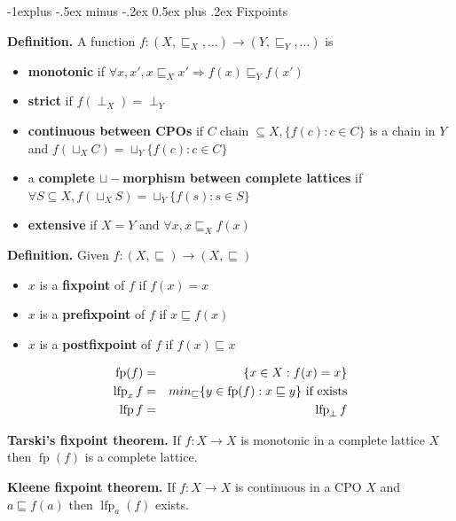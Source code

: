 \documentclass[10pt,landscape]{article}
\makeatletter
\renewcommand{\subsection}{\@startsection{subsection}{2}{0mm}%
                                {-1explus -.5ex minus -.2ex}%
                                {0.5ex plus .2ex}%
                                {\normalfont\normalsize\bfseries}}
\makeatother
\begin{document}
\begin{multicols}{3}
\subsection{Fixpoints}

\textbf{Definition.} A function $f : (X, \sqsubseteq_X, \dots) \rightarrow (Y, \sqsubseteq_Y, \dots)$ is
\begin{itemize}\setlength{\itemsep}{-0.7mm}
\item \textbf{monotonic} if $\forall x, x', x \sqsubseteq_X x' \Rightarrow f(x) \sqsubseteq_Y f(x')$
\item \textbf{strict} if $f (\perp_X) = \perp_Y$
\item \textbf{continuous between CPOs} if $C \operatorname{chain} \subseteq X, \{ f(c) : c \in C \}$ is a chain in $Y$ and $f (\sqcup_X C) = \sqcup_Y \{ f(c) : c \in C\}$
\item a \textbf{complete $\sqcup -$morphism between complete lattices} if $\forall S \subseteq X, f (\sqcup_X S) = \sqcup_Y \{ f(s) : s \in S \}$
\item \textbf{extensive} if $X = Y$ and $\forall x, x \sqsubseteq_X f(x)$
\end{itemize}

\textbf{Definition.} Given $f : (X, \sqsubseteq) \rightarrow (X, \sqsubseteq)$
\begin{itemize}\setlength{\itemsep}{-0.7mm}
\item $x$ is a \textbf{fixpoint} of $f$ if $f(x) = x$
\item $x$ is a \textbf{prefixpoint} of $f$ if $x \sqsubseteq f(x)$
\item $x$ is a \textbf{postfixpoint} of $f$ if $f(x) \sqsubseteq x$
\end{itemize}

\begin{eqnarray*}
  \operatorname{fp} (f) &=& \{ x \in X : f(x) = x\}\\
  \operatorname{lfp}_x f &=& min_{\sqsubseteq}\{ y \in \operatorname{fp}(f) : x \sqsubseteq y \} \textup{ if exists}\\
  \operatorname{lfp} f &=& \operatorname{lfp}_{\perp} f
\end{eqnarray*}

\textbf{Tarski's fixpoint theorem.} If $f : X \rightarrow X$ is monotonic in a complete lattice $X$ then $\operatorname{fp}(f)$ is a complete lattice.

\textbf{Kleene fixpoint theorem.} If $f : X \rightarrow X$ is continuous in a CPO $X$ and $a \sqsubseteq f(a)$ then $\operatorname{lfp}_a(f)$ exists.


\end{multicols}
\end{document}
